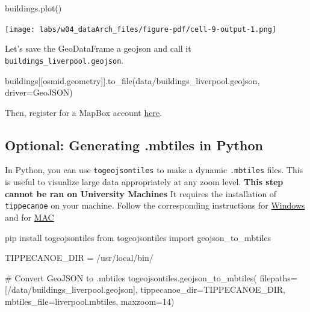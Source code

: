 \documentclass[
  letterpaper,
  DIV=11,
  numbers=noendperiod]{scrreprt}
\newenvironment{Shaded}{\begin{snugshade}}{\end{snugshade}}
\newcommand{\CommentTok}[1]{\textcolor[rgb]{0.37,0.37,0.37}{#1}}
\newcommand{\DecValTok}[1]{\textcolor[rgb]{0.68,0.00,0.00}{#1}}
\newcommand{\ImportTok}[1]{\textcolor[rgb]{0.00,0.46,0.62}{#1}}
\newcommand{\NormalTok}[1]{\textcolor[rgb]{0.00,0.23,0.31}{#1}}
\newcommand{\OperatorTok}[1]{\textcolor[rgb]{0.37,0.37,0.37}{#1}}
\newcommand{\StringTok}[1]{\textcolor[rgb]{0.13,0.47,0.30}{#1}}
\begin{document}
\begin{Shaded}
\begin{Highlighting}[]
\NormalTok{buildings.plot()}
\end{Highlighting}
\end{Shaded}

\texttt{[image: labs/w04\_dataArch\_files/figure-pdf/cell-9-output-1.png]}

Let's save the GeoDataFrame a geojson and call it
\texttt{buildings\_liverpool.geojson}.

\begin{Shaded}
\begin{Highlighting}[]
\NormalTok{buildings[[}\StringTok{\textquotesingle{}osmid\textquotesingle{}}\NormalTok{,}\StringTok{\textquotesingle{}geometry\textquotesingle{}}\NormalTok{]].to\_file(}\StringTok{\textquotesingle{}data/buildings\_liverpool.geojson\textquotesingle{}}\NormalTok{,  driver}\OperatorTok{=}\StringTok{\textquotesingle{}GeoJSON\textquotesingle{}}\NormalTok{)}
\end{Highlighting}
\end{Shaded}

Then, register for a MapBox account
\href{https://account.mapbox.com/auth/signup/?route-to=\%22https\%3A\%2F\%2Faccount.mapbox.com\%2Faccess-tokens\%2F\%22}{here}.

\subsection{Optional: Generating .mbtiles in
Python}\label{optional-generating-.mbtiles-in-python}

In Python, you can use \texttt{togeojsontiles} to make a dynamic
\texttt{.mbtiles} files. This is useful to visualize large data
appropriately at any zoom level. \textbf{This step cannot be ran on
University Machines} It requires the installation of \texttt{tippecanoe}
on your machine. Follow the corresponding instructions for
\href{https://gist.github.com/ryanbaumann/e5c7d76f6eeb8598e66c5785b677726e}{Windows}
and for \href{https://github.com/mapbox/tippecanoe}{MAC}

\begin{Shaded}
\begin{Highlighting}[]
\NormalTok{pip install togeojsontiles}
\ImportTok{from}\NormalTok{ togeojsontiles }\ImportTok{import}\NormalTok{ geojson\_to\_mbtiles}

\NormalTok{TIPPECANOE\_DIR }\OperatorTok{=} \StringTok{\textquotesingle{}/usr/local/bin/\textquotesingle{}}

\CommentTok{\# Convert GeoJSON to .mbtiles}
\NormalTok{togeojsontiles.geojson\_to\_mbtiles(}
\NormalTok{    filepaths}\OperatorTok{=}\NormalTok{[}\StringTok{\textquotesingle{}/data/buildings\_liverpool.geojson\textquotesingle{}}\NormalTok{],}
\NormalTok{    tippecanoe\_dir}\OperatorTok{=}\NormalTok{TIPPECANOE\_DIR,}
\NormalTok{    mbtiles\_file}\OperatorTok{=}\StringTok{\textquotesingle{}liverpool.mbtiles\textquotesingle{}}\NormalTok{,}
\NormalTok{    maxzoom}\OperatorTok{=}\DecValTok{14}\NormalTok{)}
\end{Highlighting}
\end{Shaded}
\end{document}
